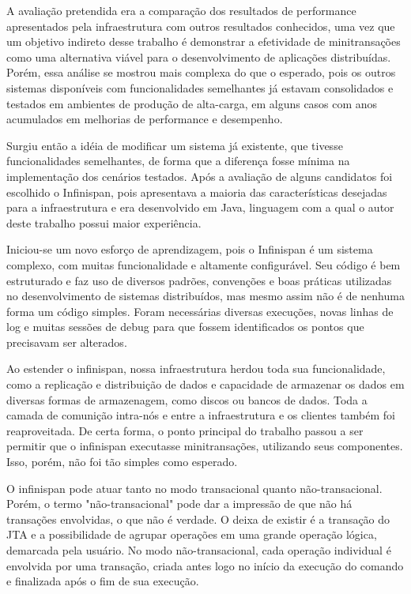 \documentclass[11pt,twoside,a4paper]{book}
\begin{document}
A avaliação pretendida era a comparação dos resultados de performance apresentados pela infraestrutura com outros resultados conhecidos, uma vez que um objetivo indireto desse trabalho é demonstrar a efetividade de minitransações como uma alternativa viável para o desenvolvimento de aplicações distribuídas. Porém, essa análise se mostrou mais complexa do que o esperado, pois os outros sistemas disponíveis com funcionalidades semelhantes já estavam consolidados e testados em ambientes de produção de alta-carga, em alguns casos com anos acumulados em melhorias de performance e desempenho.

Surgiu então a idéia de modificar um sistema já existente, que tivesse funcionalidades semelhantes, de forma que a diferença fosse mínima na implementação dos cenários testados. Após a avaliação de alguns candidatos foi escolhido o Infinispan, pois apresentava a maioria das características desejadas para a infraestrutura e era desenvolvido em Java, linguagem com a qual o autor deste trabalho possui maior experiência.

Iniciou-se um novo esforço de aprendizagem, pois o Infinispan é um sistema complexo, com muitas funcionalidade e altamente configurável. Seu código é bem estruturado e faz uso de diversos padrões, convenções e boas práticas utilizadas no desenvolvimento de sistemas distribuídos, mas mesmo assim não é de nenhuma forma um código simples. Foram necessárias diversas execuções, novas linhas de log e muitas sessões de debug para que fossem identificados os pontos que precisavam ser alterados. 

Ao estender o infinispan, nossa infraestrutura herdou toda sua funcionalidade, como a replicação e distribuição de dados e capacidade de armazenar os dados em diversas formas de armazenagem, como discos ou bancos de dados. Toda a camada de comunição intra-nós e entre a infraestrutura e os clientes também foi reaproveitada. De certa forma, o ponto principal do trabalho passou a ser permitir que o infinispan executasse minitransações, utilizando seus componentes. Isso, porém, não foi tão simples como esperado.

O infinispan pode atuar tanto no modo transacional quanto não-transacional. Porém, o termo "não-transacional" pode dar a impressão de que não há transações envolvidas, o que não é verdade. O deixa de existir é a transação do JTA e a possibilidade de agrupar operações em uma grande operação lógica, demarcada pela usuário. No modo não-transacional, cada operação individual é envolvida por uma transação, criada antes logo no início da execução do comando e finalizada após o fim de sua execução.
\end{document}
